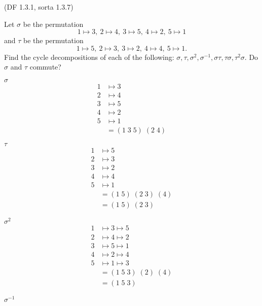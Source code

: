 \begin{problem}{\textsf{(DF 1.3.1, sorta 1.3.7)}}
  \begin{enumalph}
  \item Let $\sigma$ be the permutation
  \[ 1 \mapsto 3,\ 2 \mapsto 4,\ 3 \mapsto 5,\ 4 \mapsto 2,\ 5 \mapsto 1 \]
  and $\tau$ be the permutation
  \[ 1 \mapsto 5,\ 2 \mapsto 3,\ 3 \mapsto 2,\ 4 \mapsto 4,\ 5 \mapsto 1. \]
  Find the cycle decompositions of each of the following: $\sigma,\tau,\sigma^2,
  \sigma^{-1},\sigma\tau,\tau\sigma,\tau^2\sigma$.  Do $\sigma$ and $\tau$ commute?
  
  \begin{Answer}
    \begin{enumroman}
      \item $\sigma$
      \begin{align*}
        1 &\mapsto 3 \\
        2 &\mapsto 4 \\
        3 &\mapsto 5 \\
        4 &\mapsto 2 \\
        5 &\mapsto 1 \\
        &= (1\;3\;5)\; (2\;4)
      \end{align*}
      \item $\tau$
      \begin{align*}
        1 &\mapsto 5 \\
        2 &\mapsto 3 \\
        3 &\mapsto 2 \\
        4 &\mapsto 4 \\
        5 &\mapsto 1 \\
        &= (1\;5)\; (2\;3)\; (4)\\
        &= (1\;5)\; (2\;3)
      \end{align*}
      \item $\sigma^2$
      \begin{align*}
        1 &\mapsto 3 \mapsto 5 \\
        2 &\mapsto 4 \mapsto 2 \\
        3 &\mapsto 5 \mapsto 1 \\
        4 &\mapsto 2 \mapsto 4 \\
        5 &\mapsto 1 \mapsto 3 \\
        &= (1\;5\;3)\; (2)\; (4)\\
        &= (1\;5\;3)
      \end{align*}
      \item $\sigma^{-1}$
      \begin{align*}

\end{align*}
\end{enumroman}
\end{Answer}
\end{enumalph}
\end{problem}
